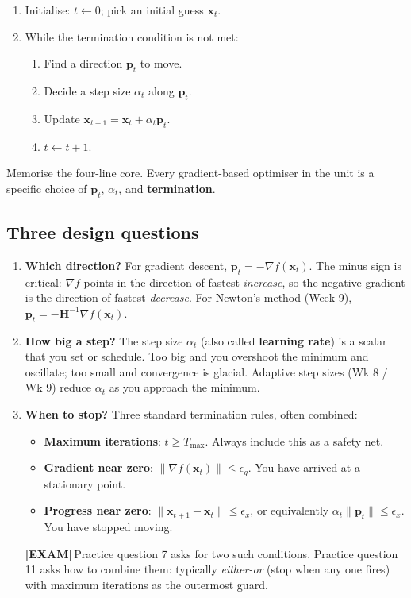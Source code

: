 \documentclass[11pt, a4paper]{article}
\newcommand{\examflag}{\textcolor{tipBd}{\textbf{[EXAM]}}\,}
\begin{document}
\begin{defbox}
\begin{enumerate}
  \item Initialise: $t \leftarrow 0$; pick an initial guess $\mathbf{x}_t$.
  \item While the termination condition is not met:
  \begin{enumerate}
    \item Find a direction $\mathbf{p}_t$ to move.
    \item Decide a step size $\alpha_t$ along $\mathbf{p}_t$.
    \item Update $\mathbf{x}_{t+1} = \mathbf{x}_t + \alpha_t \mathbf{p}_t$.
    \item $t \leftarrow t+1$.
  \end{enumerate}
\end{enumerate}
\end{defbox}

Memorise the four-line core. Every gradient-based optimiser in the unit is a specific choice of \textbf{$\mathbf{p}_t$}, \textbf{$\alpha_t$}, and \textbf{termination}.

\subsection{Three design questions}

\begin{enumerate}
  \item \textbf{Which direction?} For gradient descent, $\mathbf{p}_t = -\nabla f(\mathbf{x}_t)$. The minus sign is critical: $\nabla f$ points in the direction of fastest \emph{increase}, so the negative gradient is the direction of fastest \emph{decrease}. For Newton's method (Week 9), $\mathbf{p}_t = -\mathbf{H}^{-1}\nabla f(\mathbf{x}_t)$.
  \item \textbf{How big a step?} The step size $\alpha_t$ (also called \textbf{learning rate}) is a scalar that you set or schedule. Too big and you overshoot the minimum and oscillate; too small and convergence is glacial. Adaptive step sizes (Wk 8 / Wk 9) reduce $\alpha_t$ as you approach the minimum.
  \item \textbf{When to stop?} Three standard termination rules, often combined:
    \begin{itemize}
      \item \textbf{Maximum iterations}: $t \ge T_{\max}$. Always include this as a safety net.
      \item \textbf{Gradient near zero}: $\|\nabla f(\mathbf{x}_t)\| \le \epsilon_g$. You have arrived at a stationary point.
      \item \textbf{Progress near zero}: $\|\mathbf{x}_{t+1} - \mathbf{x}_t\| \le \epsilon_x$, or equivalently $\alpha_t \|\mathbf{p}_t\| \le \epsilon_x$. You have stopped moving.
    \end{itemize}
    \examflag{}Practice question 7 asks for two such conditions. Practice question 11 asks how to combine them: typically \emph{either-or} (stop when any one fires) with maximum iterations as the outermost guard.
\end{enumerate}
\end{document}

